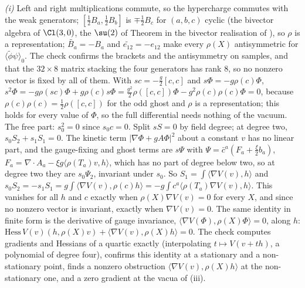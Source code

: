 \emph{(i)} Left and right multiplications commute, so the hypercharge commutes with the weak generators; $[\tfrac12B_{a}, \tfrac12B_{b}]$ is $\mp\tfrac12B_{c}$ for $(a, b, c)$ cyclic (the bivector algebra of $\Cl(3,0)$, the $\su(2)$ of Theorem  in the bivector realisation of ), so $\rho$ is a representation; $\widetilde{B_{a}} = -B_{a}$ and $\widetilde{e_{12}} = -e_{12}$ make every $\rho(X)$ antisymmetric for $\langle\widetilde{\phi}\psi\rangle_{0}$. The check confirms the brackets and the antisymmetry on samples, and that the $32 \times 8$ matrix stacking the four generators has rank $8$, so no nonzero vector is fixed by all of them. With $sc = -\tfrac{g}{2}[c, c]$ and $s\Phi = -g\rho(c)\Phi$, $s^{2}\Phi = -g\rho(sc)\Phi + g\rho(c)s\Phi = \tfrac{g^{2}}{2}\rho([c, c])\Phi - g^{2}\rho(c)\rho(c)\Phi = 0$, because $\rho(c)\rho(c) = \tfrac12\rho([c, c])$ for the odd ghost and $\rho$ is a representation; this holds for every value of $\Phi$, so the full differential needs nothing of the vacuum. The free part: $s_{0}^{2} = 0$ since $s_{0}c = 0$. Split $sS = 0$ by field degree; at degree two, $s_{0}S_{2} + s_{1}S_{1} = 0$. The kinetic term $|\nabla\Phi + gA\Phi|^{2}$ about a constant $v$ has no linear part, and the gauge-fixing and ghost terms are $s\Psi$ with $\Psi = \bar c^{a}(F_{a} + \tfrac{\xi}{2}b_{a})$, $F_{a} = \nabla\cdot A_{a} - \xi g\langle\rho(T_{a})v, h\rangle$, which has no part of degree below two, so at degree two they are $s_{0}\Psi_{2}$, invariant under $s_{0}$. So $S_{1} = \int\langle\nabla V(v), h\rangle$ and $s_{0}S_{2} = -s_{1}S_{1} = g\int\langle\nabla V(v), \rho(c)h\rangle = -g\int c^{a}\langle\rho(T_{a})\nabla V(v), h\rangle$. This vanishes for all $h$ and $c$ exactly when $\rho(X)\nabla V(v) = 0$ for every $X$, and since no nonzero vector is invariant, exactly when $\nabla V(v) = 0$. The same identity in finite form is the derivative of gauge invariance, $\langle\nabla V(\Phi), \rho(X)\Phi\rangle = 0$, along $h$: $\mathrm{Hess}\,V(v)(h, \rho(X)v) + \langle\nabla V(v), \rho(X)h\rangle = 0$. The check computes gradients and Hessians of a quartic exactly (interpolating $t \mapsto V(v + th)$, a polynomial of degree four), confirms this identity at a stationary and a non-stationary point, finds a nonzero obstruction $\langle\nabla V(v), \rho(X)h\rangle$ at the non-stationary one, and a zero gradient at the vacua of (iii).

